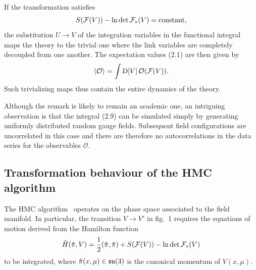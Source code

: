 If the transformation satisfies
\begin{equation}
  S(\mathcal{F}(V))-\ln\det\mathcal{F}_{*}(V)=\text{constant},
\end{equation}
the substitution $U\to V$ of the integration variables
in the functional integral
maps the theory to the trivial one where the link variables
are completely decoupled from one another.
The expectation values (2.1) are then given by
\begin{equation}
  \langle\mathcal{O}\rangle=
  \int\mathrm{D}[V]\,\mathcal{O}(\mathcal{F}(V)).
\end{equation}
Such trivializing maps thus contain the entire
dynamics of the theory.

Although the remark is likely to remain an academic one,
an intriguing observation is that the integral (2.9)
can be simulated simply by generating
uniformly distributed random gauge fields. Subsequent
field configurations are uncorrelated in this case
and there are therefore no autocorrelations in
the data series for the observables $\mathcal{O}$.


\subsection{Transformation behaviour of the HMC algorithm}

The HMC algorithm~\cite{HMC} operates on the phase space
associated to the field manifold.
In particular, the transition $V\to V'$ in fig.~1 requires
the equations of motion derived from the Hamilton function
\begin{equation}
  \hat{H}(\hat{\pi},V)=
  \frac{1}{2}(\hat{\pi},\hat{\pi})+
  S(\mathcal{F}(V))-\ln\det\mathcal{F}_{*}(V)
\end{equation}
to be integrated,
where $\hat{\pi}(x,\mu)\in\mathfrak{su}(3)$ is the canonical momentum of $V(x,\mu)$.

